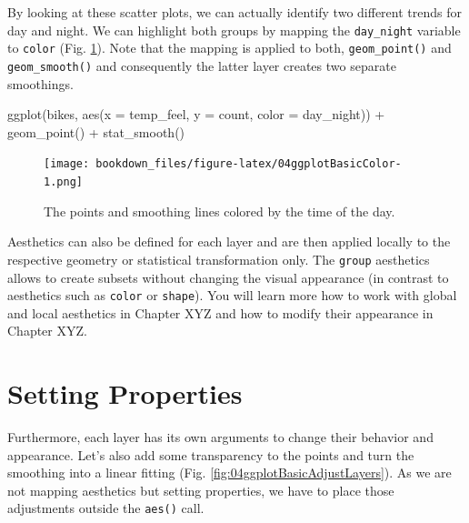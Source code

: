 \documentclass[
]{krantz}
\makeatletter
\newenvironment{Shaded}{\begin{snugshade}}{\end{snugshade}}
\newcommand{\AttributeTok}[1]{\textcolor[rgb]{0.61,0.61,0.61}{#1}}
\newcommand{\FunctionTok}[1]{\textcolor[rgb]{0,0,0}{#1}}
\newcommand{\NormalTok}[1]{#1}
\newcommand{\SpecialCharTok}[1]{\textcolor[rgb]{0,0,0}{#1}}
\newenvironment{kframe}{%
\medskip{}
\setlength{\fboxsep}{.8em}
 \def\at@end@of@kframe{}%
 \ifinner\ifhmode%
  \def\at@end@of@kframe{\end{minipage}}%
  \begin{minipage}{\columnwidth}%
 \fi\fi%
 \def\FrameCommand##1{\hskip\@totalleftmargin \hskip-\fboxsep
 \colorbox{shadecolor}{##1}\hskip-\fboxsep
     \hskip-\linewidth \hskip-\@totalleftmargin \hskip\columnwidth}%
 \MakeFramed {\advance\hsize-\width
   \@totalleftmargin\z@ \linewidth\hsize
   \@setminipage}}%
 {\par\unskip\endMakeFramed%
 \at@end@of@kframe}
\renewenvironment{Shaded}{\begin{kframe}}{\end{kframe}}
\makeatother
\begin{document}
By looking at these scatter plots, we can actually identify two different trends for day and night. We can highlight both groups by mapping the \texttt{day\_night} variable to \texttt{color} (Fig. \ref{fig:04ggplotBasicColor}). Note that the mapping is applied to both, \texttt{geom\_point()} and \texttt{geom\_smooth()} and consequently the latter layer creates two separate smoothings.

\begin{Shaded}
\begin{Highlighting}[]
\FunctionTok{ggplot}\NormalTok{(bikes, }\FunctionTok{aes}\NormalTok{(}\AttributeTok{x =}\NormalTok{ temp\_feel, }\AttributeTok{y =}\NormalTok{ count, }\AttributeTok{color =}\NormalTok{ day\_night)) }\SpecialCharTok{+} 
  \FunctionTok{geom\_point}\NormalTok{() }\SpecialCharTok{+} 
  \FunctionTok{stat\_smooth}\NormalTok{()}
\end{Highlighting}
\end{Shaded}

\begin{figure}
\centering
\texttt{[image: bookdown\_files/figure-latex/04ggplotBasicColor-1.png]}
\caption{\label{fig:04ggplotBasicColor}The points and smoothing lines colored by the time of the day.}
\end{figure}

Aesthetics can also be defined for each layer and are then applied locally to the respective geometry or statistical transformation only. The \texttt{group} aesthetics allows to create subsets without changing the visual appearance (in contrast to aesthetics such as \texttt{color} or \texttt{shape}).
You will learn more how to work with global and local aesthetics in Chapter XYZ and how to modify their appearance in Chapter XYZ.

\hypertarget{set-properties}{%
\section{Setting Properties}\label{set-properties}}

Furthermore, each layer has its own arguments to change their behavior and appearance. Let's also add some transparency to the points and turn the smoothing into a linear fitting (Fig. \ref{fig:04ggplotBasicAdjustLayers}). As we are not mapping aesthetics but setting properties, we have to place those adjustments outside the \texttt{aes()} call.
\end{document}
